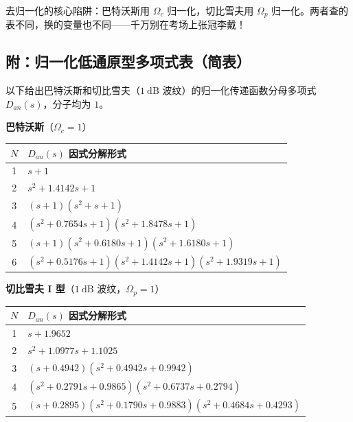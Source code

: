 \documentclass[12pt,a4paper]{ctexart}
\newcommand{\Omegac}{\Omega_c}
\newcommand{\Omegap}{\Omega_p}
\newcommand{\db}{\ \mathrm{dB}}
\begin{document}
\begin{pitfall}
去归一化的核心陷阱：巴特沃斯用 $\Omegac$ 归一化，切比雪夫用 $\Omegap$ 归一化。两者查的表不同，换的变量也不同——千万别在考场上张冠李戴！
\end{pitfall}

\newpage
\subsection*{附：归一化低通原型多项式表（简表）}

以下给出巴特沃斯和切比雪夫（$1\db$ 波纹）的归一化传递函数分母多项式 $D_{an}(s)$，分子均为 $1$。

\vspace{4pt}

\noindent
\begin{minipage}{\textwidth}
\centering\small
\textbf{巴特沃斯}（$\Omegac=1$）\\[4pt]
\setlength{\tabcolsep}{6pt}
\begin{tabular}{c|p{}}
\toprule
$N$ & $D_{an}(s)$ 因式分解形式 \\
\midrule
1  & $s+1$ \\
2  & $s^2 + 1.4142s + 1$ \\
3  & $(s+1)(s^2 + s + 1)$ \\
4  & $(s^2 + 0.7654s + 1)(s^2 + 1.8478s + 1)$ \\
5  & $(s+1)(s^2 + 0.6180s + 1)(s^2 + 1.6180s + 1)$ \\
6  & $(s^2 + 0.5176s + 1)(s^2 + 1.4142s + 1)(s^2 + 1.9319s + 1)$ \\
\bottomrule
\end{tabular}
\end{minipage}

\vspace{10pt}

\noindent
\begin{minipage}{\textwidth}
\centering\small
\textbf{切比雪夫 I 型}（$1\db$ 波纹，$\Omegap=1$）\\[4pt]
\setlength{\tabcolsep}{6pt}
\begin{tabular}{c|p{}}
\toprule
$N$ & $D_{an}(s)$ 因式分解形式 \\
\midrule
1  & $s+1.9652$ \\
2  & $s^2 + 1.0977s + 1.1025$ \\
3  & $(s+0.4942)(s^2 + 0.4942s + 0.9942)$ \\
4  & $(s^2+0.2791s+0.9865)(s^2+0.6737s+0.2794)$ \\
5  & $(s+0.2895)(s^2+0.1790s+0.9883)(s^2+0.4684s+0.4293)$ \\
\bottomrule
\end{tabular}
\end{minipage}
\end{document}
